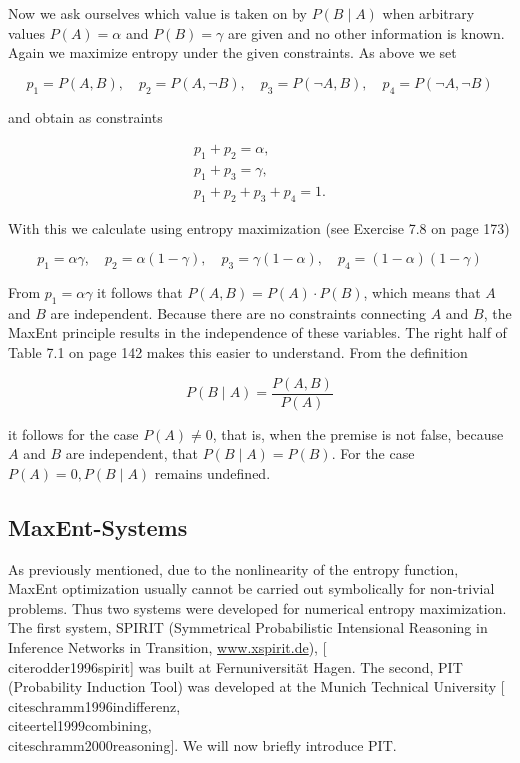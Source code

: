\documentclass[10pt]{book}
\begin{document}
Now we ask ourselves which value is taken on by $P(B \mid A)$ when arbitrary values $P(A)=\alpha$ and $P(B)=\gamma$ are given and no other information is known. Again we maximize entropy under the given constraints. As above we set

$$
p_{1}=P(A, B), \quad p_{2}=P(A, \neg B), \quad p_{3}=P(\neg A, B), \quad p_{4}=P(\neg A, \neg B)
$$

and obtain as constraints


\begin{gather*}
p_{1}+p_{2}=\alpha,  \tag{7.10}\\
p_{1}+p_{3}=\gamma,  \tag{7.11}\\
p_{1}+p_{2}+p_{3}+p_{4}=1 . \tag{7.12}
\end{gather*}


With this we calculate using entropy maximization (see Exercise 7.8 on page 173)

$$
p_{1}=\alpha \gamma, \quad p_{2}=\alpha(1-\gamma), \quad p_{3}=\gamma(1-\alpha), \quad p_{4}=(1-\alpha)(1-\gamma)
$$

From $p_{1}=\alpha \gamma$ it follows that $P(A, B)=P(A) \cdot P(B)$, which means that $A$ and $B$ are independent. Because there are no constraints connecting $A$ and $B$, the MaxEnt principle results in the independence of these variables. The right half of Table 7.1 on page 142 makes this easier to understand. From the definition

$$
P(B \mid A)=\frac{P(A, B)}{P(A)}
$$

it follows for the case $P(A) \neq 0$, that is, when the premise is not false, because $A$ and $B$ are independent, that $P(B \mid A)=P(B)$. For the case $P(A)=0, P(B \mid A)$ remains undefined.

\subsection{MaxEnt-Systems}
As previously mentioned, due to the nonlinearity of the entropy function, MaxEnt optimization usually cannot be carried out symbolically for non-trivial problems. Thus two systems were developed for numerical entropy maximization. The first system, SPIRIT (Symmetrical Probabilistic Intensional Reasoning in Inference Networks in Transition, \href{http://www.xspirit.de}{www.xspirit.de}), [\\cite{rodder1996spirit}] was built at Fernuniversität Hagen. The second, PIT (Probability Induction Tool) was developed at the Munich Technical University [\\cite{schramm1996indifferenz}, \\cite{ertel1999combining}, \\cite{schramm2000reasoning}]. We will now briefly introduce PIT.
\end{document}

